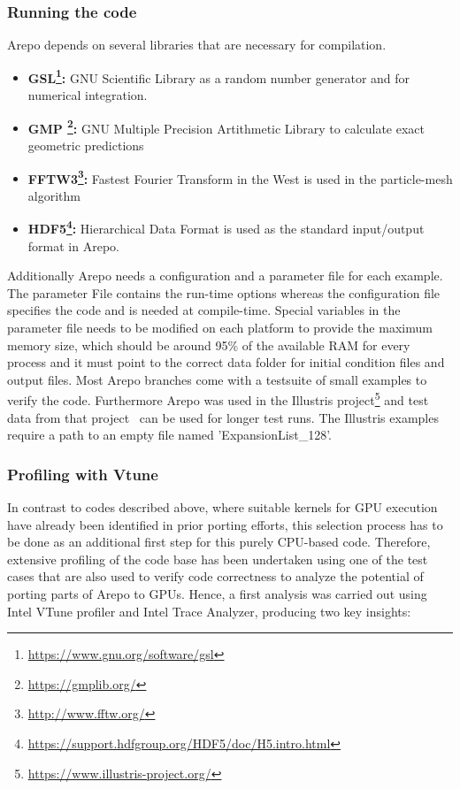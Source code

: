 \documentclass[../main]{subfiles}
\begin{document}
\subsubsection{Running the code}
Arepo depends on several libraries that are necessary for compilation. 
    \begin{itemize}
        \item{\textbf{GSL\footnote{\url{https://www.gnu.org/software/gsl}}:}} GNU Scientific Library as a random number generator and for numerical integration.
        \item{\textbf{GMP \footnote{\url{https://gmplib.org/}}:}} GNU Multiple Precision Artithmetic Library to calculate exact geometric predictions
        \item{\textbf{FFTW3\footnote{\url{http://www.fftw.org/}}:}} Fastest Fourier Transform in the West is used in the particle-mesh algorithm
        \item{\textbf{HDF5\footnote{\url{https://support.hdfgroup.org/HDF5/doc/H5.intro.html}}:}} Hierarchical Data Format is used as the standard input/output format in Arepo. 
    \end{itemize}
Additionally Arepo needs a configuration and a parameter file for each example. The parameter File contains the run-time options whereas the configuration file specifies the code and is needed at compile-time. Special variables in the parameter file needs to be modified on each platform to provide the maximum memory size, which should be around 95\% of the available RAM for every process and it must point to the correct data folder for initial condition files and output files. Most Arepo branches come with a testsuite of small examples to verify the code. Furthermore Arepo was used in the Illustris project\footnote{\url{https://www.illustris-project.org/}} and test data from that project~\cite{Nelson_2015} can be used for longer test runs. The Illustris examples require a path to an empty file named 'ExpansionList\_128'. 

\subsubsection{Profiling with Vtune}
In contrast to codes described above, where suitable kernels for GPU execution have already been identified in prior porting efforts, this selection process has to be done as an additional first step for this purely CPU-based code.
Therefore, extensive profiling of the code base has been undertaken using one of the test cases that are also used to verify code correctness to analyze the potential of porting parts of Arepo to GPUs.
Hence, a first analysis was carried out using Intel VTune profiler and Intel Trace Analyzer, producing two key insights:
\end{document}
